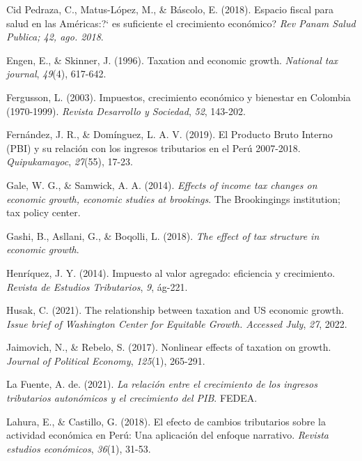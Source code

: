 \documentclass[
  jou,
  floatsintext,
  longtable,
  a4paper,
  nolmodern,
  notxfonts,
  notimes,
  12pt,
  colorlinks=true,linkcolor=blue,citecolor=blue,urlcolor=blue]{apa7}
\newlength{\cslhangindent}
\newenvironment{CSLReferences}[2] %
 {\begin{list}{}{%
  \setlength{\itemindent}{0pt}
  \setlength{\leftmargin}{0pt}
  \setlength{\parsep}{0pt}
  \ifodd #1
   \setlength{\leftmargin}{\cslhangindent}
   \setlength{\itemindent}{-1\cslhangindent}
  \fi
  \setlength{\itemsep}{#2\baselineskip}}}
 {\end{list}}
\begin{document}
\begin{CSLReferences}{1}{0}
Cid Pedraza, C., Matus-López, M., \& Báscolo, E. (2018). Espacio fiscal
para salud en las Américas:?{\kern0pt}` es suficiente el crecimiento
económico? \emph{Rev Panam Salud Publica; 42, ago. 2018}.

Engen, E., \& Skinner, J. (1996). Taxation and economic growth.
\emph{National tax journal}, \emph{49}(4), 617-642.

Fergusson, L. (2003). Impuestos, crecimiento económico y bienestar en
Colombia (1970-1999). \emph{Revista Desarrollo y Sociedad}, \emph{52},
143-202.

Fernández, J. R., \& Domínguez, L. A. V. (2019). El Producto Bruto
Interno ({PBI}) y su relación con los ingresos tributarios en el Perú
2007-2018. \emph{Quipukamayoc}, \emph{27}(55), 17-23.

Gale, W. G., \& Samwick, A. A. (2014). \emph{Effects of income tax
changes on economic growth, economic studies at brookings}. The
Brookingings institution; tax policy center.

Gashi, B., Asllani, G., \& Boqolli, L. (2018). \emph{The effect of tax
structure in economic growth}.

Henríquez, J. Y. (2014). Impuesto al valor agregado: eficiencia y
crecimiento. \emph{Revista de Estudios Tributarios}, \emph{9}, ág-221.

Husak, C. (2021). The relationship between taxation and {US} economic
growth. \emph{Issue brief of Washington Center for Equitable Growth.
Accessed July}, \emph{27}, 2022.

Jaimovich, N., \& Rebelo, S. (2017). Nonlinear effects of taxation on
growth. \emph{Journal of Political Economy}, \emph{125}(1), 265-291.

La Fuente, A. de. (2021). \emph{La relación entre el crecimiento de los
ingresos tributarios autonómicos y el crecimiento del {PIB}}. {FEDEA}.

Lahura, E., \& Castillo, G. (2018). El efecto de cambios tributarios
sobre la actividad económica en Perú: Una aplicación del enfoque
narrativo. \emph{Revista estudios económicos}, \emph{36}(1), 31-53.


\end{CSLReferences}
\end{document}
